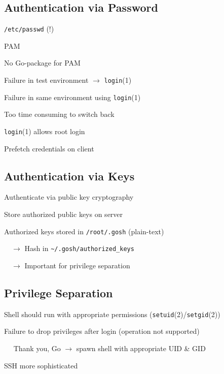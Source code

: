 \documentclass[
	xcolor=dvipsnames,
	handout
]{beamer}
\newenvironment{zhawframe}[1][]
{\begin{frame}[environment=fr,#1]{\insertsubsectionhead}{\insertsectionhead}}
{\end{frame}
}
\begin{document}
\subsection{Authentication via Password}
\begin{zhawframe}
 \texttt{/etc/passwd} (!)

 PAM

 No Go-package for PAM

 Failure in test environment $\rightarrow$ \texttt{login}(1)

 Failure in same environment using \texttt{login}(1)

 Too time consuming to switch back

 \texttt{login}(1) allows root login

 Prefetch credentials on client
\end{zhawframe}

\subsection{Authentication via Keys}
\begin{zhawframe}
 Authenticate via public key cryptography

 Store authorized public keys on server

 Authorized keys stored in \texttt{/root/.gosh} (plain-text)

$\quad\rightarrow$ Hash in \texttt{\textasciitilde{}/.gosh/authorized\_{}keys}

$\quad\rightarrow$ Important for privilege separation
\end{zhawframe}

\subsection{Privilege Separation}
\begin{zhawframe}
 Shell should run with appropriate permissions (\texttt{setuid}(2)/\texttt{setgid}(2))

 Failure to drop privileges after login (operation not supported)

 $\quad$ Thank you, Go $\rightarrow$ spawn shell with appropriate UID \& GID

 SSH more sophisticated
\end{zhawframe}
\end{document}
